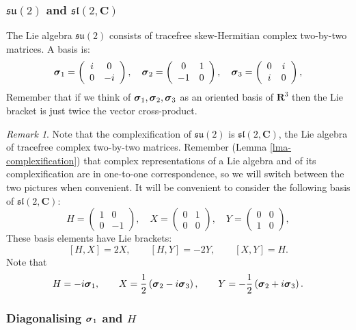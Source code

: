 \documentclass[12pt]{article}
\renewcommand\vec[1]{\ensuremath\boldsymbol{#1}}
\newcommand{\CC}{\mathbf{C}}
\newcommand{\RR}{\mathbf{R}}
\theoremstyle{definition}
\theoremstyle{check}
\theoremstyle{remark}
\newtheorem{rmk}[thm]{Remark}
\theoremstyle{TheoremNum}
\begin{document}
\subsubsection{$\mathfrak{su}(2)$ and $\mathfrak{sl}(2,\CC)$}

The Lie algebra $\mathfrak{su}(2)$ consists of tracefree skew-Hermitian complex two-by-two matrices. A basis is:
\[\vec{\sigma}_1=\left(\begin{array}{cc}i & 0\\ 0 & -i\end{array}\right),\quad \vec{\sigma}_2=\left(\begin{array}{cc}0 & 1\\ -1 & 0\end{array}\right),\quad \vec{\sigma}_3=\left(\begin{array}{cc}0 & i\\ i & 0\end{array}\right),\]
Remember that if we think of $\vec{\sigma}_1,\vec{\sigma}_2,\vec{\sigma}_3$ as an oriented basis of $\RR^3$ then the Lie bracket is just twice the vector cross-product.

\begin{rmk}
Note that the complexification of $\mathfrak{su}(2)$ is $\mathfrak{sl}(2,\CC)$, the Lie algebra of tracefree complex two-by-two matrices. Remember (Lemma \ref{lma-complexification}) that complex representations of a Lie algebra and of its complexification are in one-to-one correspondence, so we will switch between the two pictures when convenient. It will be convenient to consider the following basis of $\mathfrak{sl}(2,\CC)$:
\[H=\left(\begin{array}{cc}1 & 0\\ 0 & -1\end{array}\right),\quad X=\left(\begin{array}{cc}0 & 1\\ 0 & 0\end{array}\right),\quad Y=\left(\begin{array}{cc}0 & 0\\ 1 & 0\end{array}\right),\]
These basis elements have Lie brackets:
\[[H,X]=2X,\qquad [H,Y]=-2Y,\qquad [X,Y]=H.\]
Note that
\[H=-i\vec{\sigma}_1,\qquad X=\frac{1}{2}\left(\vec{\sigma}_2-i\vec{\sigma}_3\right),\qquad Y=-\frac{1}{2}\left(\vec{\sigma}_2+i\vec{\sigma}_3\right).\]
\end{rmk}

\subsubsection{Diagonalising $\vec{\sigma}_1$ and $H$}
\end{document}
